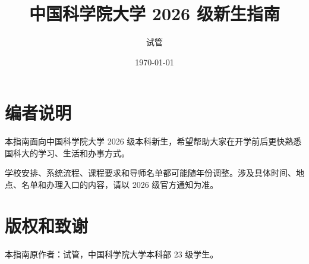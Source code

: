 \documentclass[UTF8,oneside,openany,zihao=-4]{ctexbook}
\title{中国科学院大学 2026 级新生指南}
\author{试管}
\date{\today}
\begin{document}
\frontmatter
\maketitle

\chapter*{编者说明}
本指南面向中国科学院大学 2026 级本科新生，希望帮助大家在开学前后更快熟悉国科大的学习、生活和办事方式。

学校安排、系统流程、课程要求和导师名单都可能随年份调整。涉及具体时间、地点、名单和办理入口的内容，请以 2026 级官方通知为准。

\tableofcontents

\mainmatter




\appendix



\backmatter
\chapter*{版权和致谢}
本指南原作者：试管，中国科学院大学本科部 23 级学生。
\end{document}
